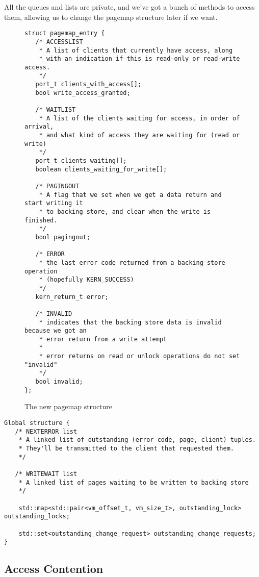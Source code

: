 \documentclass{article}
\begin{document}
All the queues and lists are private, and we've got a bunch of methods
to access them, allowing us to change the pagemap structure later if
we want.

\begin{figure}[h]
\begin{mdframed}[backgroundcolor=lightblue]
\begin{verbatim}
struct pagemap_entry {
   /* ACCESSLIST
    * A list of clients that currently have access, along
    * with an indication if this is read-only or read-write access.
    */
   port_t clients_with_access[];
   bool write_access_granted;

   /* WAITLIST
    * A list of the clients waiting for access, in order of arrival,
    * and what kind of access they are waiting for (read or write)
    */
   port_t clients_waiting[];
   boolean clients_waiting_for_write[];

   /* PAGINGOUT
    * A flag that we set when we get a data return and start writing it
    * to backing store, and clear when the write is finished.
    */
   bool pagingout;

   /* ERROR
    * the last error code returned from a backing store operation
    * (hopefully KERN_SUCCESS)
    */
   kern_return_t error;

   /* INVALID
    * indicates that the backing store data is invalid because we got an
    * error return from a write attempt
    *
    * error returns on read or unlock operations do not set "invalid"
    */
   bool invalid;
};
\end{verbatim}
\end{mdframed}
\caption{The new pagemap structure}
\end{figure}

\begin{verbatim}
Global structure {
   /* NEXTERROR list
    * A linked list of outstanding (error code, page, client) tuples.
    * They'll be transmitted to the client that requested them.
    */

   /* WRITEWAIT list
    * A linked list of pages waiting to be written to backing store
    */

    std::map<std::pair<vm_offset_t, vm_size_t>, outstanding_lock> outstanding_locks;

    std::set<outstanding_change_request> outstanding_change_requests;
}
\end{verbatim}

\subsection{Access Contention}
\end{document}
